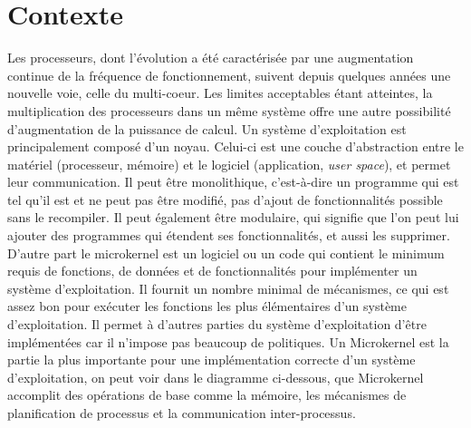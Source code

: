 \documentclass[a4paper, 12pt]{article}
\begin{document}
\newpage		
\tableofcontents %






\section{Contexte}
Les processeurs, dont l’évolution a été caractérisée par une augmentation continue de la fréquence de fonctionnement, suivent depuis quelques années une nouvelle voie, celle du multi-coeur.
Les limites acceptables étant atteintes, la multiplication des processeurs dans un même système offre une autre possibilité d’augmentation de la puissance de calcul.
\newline 
Un système d'exploitation est principalement composé d'un noyau. Celui-ci est une couche d'abstraction entre le matériel (processeur, mémoire) et le logiciel (application, \emph{user space}), et permet leur communication. Il peut être monolithique, c'est-à-dire un programme qui est tel qu'il est et ne peut pas être modifié, pas d'ajout de fonctionnalités possible sans le recompiler. Il peut également être modulaire, qui signifie que l'on peut lui ajouter des programmes qui étendent ses fonctionnalités, et aussi les supprimer.
\newline
D'autre part le microkernel est un logiciel ou un code qui contient le minimum requis de fonctions, de données et de fonctionnalités pour implémenter un système d'exploitation. Il fournit un nombre minimal de mécanismes, ce qui est assez bon pour exécuter les fonctions les plus élémentaires d'un système d'exploitation. Il permet à d'autres parties du système d'exploitation d'être implémentées car il n'impose pas beaucoup de politiques.
\newline
Un Microkernel est la partie la plus importante pour une implémentation correcte d'un système d'exploitation, on peut voir dans le diagramme ci-dessous, que Microkernel accomplit des opérations de base comme la mémoire, les mécanismes de planification de processus et la communication inter-processus.
\end{document}
